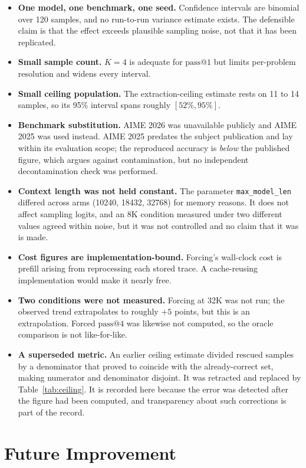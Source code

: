 \documentclass[12pt,a4paper,oneside]{report}
\begin{document}
\begin{itemize}
\item \textbf{One model, one benchmark, one seed.} Confidence intervals are
binomial over 120 samples, and no run-to-run variance estimate exists. The
defensible claim is that the effect exceeds plausible sampling noise, not that
it has been replicated.
\item \textbf{Small sample count.} $K = 4$ is adequate for $\text{pass}@1$ but
limits per-problem resolution and widens every interval.
\item \textbf{Small ceiling population.} The extraction-ceiling estimate rests
on 11 to 14 samples, so its 95\% interval spans roughly $[52\%,95\%]$.
\item \textbf{Benchmark substitution.} AIME 2026 was unavailable publicly and
AIME 2025 was used instead. AIME 2025 predates the subject publication and lay
within its evaluation scope; the reproduced accuracy is \emph{below} the
published figure, which argues against contamination, but no independent
decontamination check was performed.
\item \textbf{Context length was not held constant.} The parameter
\texttt{max\_model\_len} differed across arms (10240, 18432, 32768) for memory
reasons. It does not affect sampling logits, and an 8K condition measured under
two different values agreed within noise, but it was not controlled and no claim
that it was is made.
\item \textbf{Cost figures are implementation-bound.} Forcing's wall-clock cost
is prefill arising from reprocessing each stored trace. A cache-reusing
implementation would make it nearly free.
\item \textbf{Two conditions were not measured.} Forcing at 32K was not run; the
observed trend extrapolates to roughly $+5$ points, but this is an extrapolation.
Forced $\text{pass}@4$ was likewise not computed, so the oracle comparison is
not like-for-like.
\item \textbf{A superseded metric.} An earlier ceiling estimate divided rescued
samples by a denominator that proved to coincide with the already-correct set,
making numerator and denominator disjoint. It was retracted and replaced by
Table~\ref{tab:ceiling}. It is recorded here because the error was detected
after the figure had been computed, and transparency about such corrections is
part of the record.
\end{itemize}

\section{Future Improvement}
\end{document}
